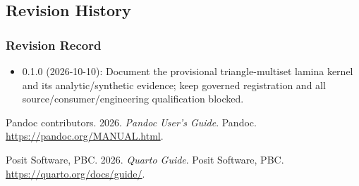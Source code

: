 \documentclass[
  american,
]{article}
\newlength{\cslhangindent}
\newenvironment{CSLReferences}[2] %
 {\begin{list}{}{%
  \setlength{\itemindent}{0pt}
  \setlength{\leftmargin}{0pt}
  \setlength{\parsep}{0pt}
  \ifodd #1
   \setlength{\leftmargin}{\cslhangindent}
   \setlength{\itemindent}{-1\cslhangindent}
  \fi
  \setlength{\itemsep}{#2\baselineskip}}}
 {\end{list}}
\providecommand{\tightlist}{%
  \setlength{\itemsep}{0pt}\setlength{\parskip}{0pt}}
\begin{document}
\subsection{Revision History}\label{revision-history-1}

\subsubsection{Revision Record}\label{revision-record-1}

\begin{itemize}
\tightlist
\item
  0.1.0 (2026-10-10): Document the provisional triangle-multiset lamina
  kernel and its analytic/synthetic evidence; keep governed registration
  and all source/consumer/engineering qualification blocked.
\end{itemize}

\protect{}\label{refs}
\begin{CSLReferences}{1}{1}
Pandoc contributors. 2026. \emph{Pandoc User's Guide}. Pandoc.
\url{https://pandoc.org/MANUAL.html}.

Posit Software, PBC. 2026. \emph{Quarto Guide}. Posit Software, PBC.
\url{https://quarto.org/docs/guide/}.

\end{CSLReferences}
\end{document}
